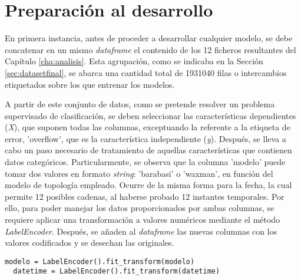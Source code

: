 \section{Preparación al desarrollo}
\label{sec:adicional}

En primera instancia, antes de proceder a desarrollar cualquier modelo, se debe concatenar en un mismo \textit{dataframe} el contenido de los 12 ficheros resultantes del Capítulo \ref{cha:analisis}. Esta agrupación, como se indicaba en la Sección \ref{sec:datasetfinal}, se abarca una cantidad total de 1931040 filas o intercambios etiquetados sobre los que entrenar los modelos. 

\vspace{3mm}

A partir de este conjunto de datos, como se pretende resolver un problema supervisado de clasificación, se deben seleccionar las características dependientes (\textit{X}), que suponen todas las columnas, exceptuando la referente a la etiqueta de error, 'overflow', que es la característica independiente (\textit{y}). Después, se lleva a cabo un paso necesario de tratamiento de aquellas características que contienen datos categóricos. Particularmente, se observa que la columna 'modelo' puede tomar dos valores en formato \textit{string}: 'barabasi' o 'waxman', en función del modelo de topología empleado. Ocurre de la misma forma para la fecha, la cual permite 12 posibles cadenas, al haberse probado 12 instantes temporales. Por ello, para poder manejar los datos proporcionados por ambas columnas, se requiere aplicar una transformación a valores numéricos mediante el método \textit{LabelEncoder}. Después, se añaden al \textit{dataframe} las nuevas columnas con los valores codificados y se desechan las originales.

\vspace{3mm}

\begin{lstlisting}[style=Python, caption={Codificación de los datos categóricos}]
  modelo = LabelEncoder().fit_transform(modelo) 
  datetime = LabelEncoder().fit_transform(datetime) 
\end{lstlisting}

\vspace{3mm}

